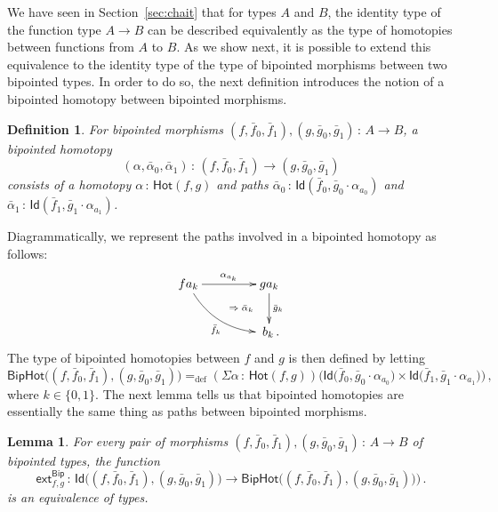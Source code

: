 \documentclass[10pt,a4paper,oneside,reqno]{amsart}
\numberwithin{equation}{section}
\theoremstyle{mythm}
\newtheorem{lemma}[theorem]{Lemma}
\theoremstyle{mydef}
\newtheorem{definition}[theorem]{Definition}
\theoremstyle{myrmk}
\newcommand{\defeq}{=_{\mathrm{def}}}
\newcommand{\co}{\,{:}\,}
\newcommand{\ct}{\cdot}
\newcommand{\Hot}{\mathsf{Hot}}
\newcommand{\ext}{\mathsf{ext}}
\newcommand{\Id}{\mathsf{Id}}
\newcommand{\Bip}{\mathsf{Bip}}
\newcommand{\BipHot}{\mathsf{BipHot}}
\begin{document}
We have seen in Section~\ref{sec:chait} that for types $A$ and $B$, the identity type of the function type
$A \to B$ can be described equivalently as the type of homotopies between functions from $A$ to $B$. As
we show next, it is possible to extend this equivalence to the identity type of the type of bipointed morphisms
between two bipointed types. In order to do so, the next definition  introduces the notion of a bipointed homotopy between bipointed morphisms. 





\begin{definition} \label{thm:biphomotopy} For bipointed morphisms $(f, \bar{f}_0, \bar{f}_1) , (g, \bar{g}_0, \bar{g}_1) \co A \to B$, 
a \emph{bipointed homotopy} 
\[
(\alpha, \bar{\alpha}_0, \bar{\alpha}_1) \co (f, \bar{f}_0, \bar{f}_1) \to  (g, \bar{g}_0, \bar{g}_1)
\] 
consists of a homotopy $\alpha \co  \Hot(f, g)$ and paths
$\bar{\alpha}_0 \co \Id(  \bar{f}_0 ,  \bar{g}_0 \ct \alpha_{a_0}  )$ and $\bar{\alpha}_1 \co \Id(
\bar{f}_1 , \bar{g}_1 \ct  \alpha_{a_1})$. 
\end{definition}

Diagrammatically, we represent the paths  involved in a bipointed homotopy as follows:
\[
\xymatrix@C=1.5cm{
f a_k  \ar[r]^{\alpha_{a_k}}  \ar@/_1pc/[dr]_{\bar{f}_k}  
\ar@{}[dr]|{\qquad \Rightarrow \; \bar{\alpha}_k}  & g a_k \ar[d]^{\bar{g}_k}  \\ 
 & \; b_k  \, .}
  \] 
The type of bipointed homotopies between $f$ and $g$ is then defined by letting
\[
 \BipHot  \big( (f,\bar{f}_0, \bar{f}_1), (g, \bar{g}_0, \bar{g}_1) \big)   \defeq   
 (\Sigma \alpha \co \Hot( f , g)) \big( 
  \Id\big( \bar{f}_0 ,   \bar{g}_0 \ct \alpha_{a_0}   \big) \times 
  \Id \big( \bar{f}_1,    \bar{g}_1 \ct \alpha_{a_1}  \big) \big) \, ,
\]
where $k \in \{ 0, 1\}$. The next lemma tells us that bipointed homotopies are essentially the
same thing as paths between bipointed morphisms.


\begin{lemma} \label{BoolHomSpace} 
For every  pair of morphisms $(f, \bar{f}_0, \bar{f}_1), (g, \bar{g}_0, \bar{g}_1) \co A \to B$ of bipointed types, the
function 
\[
\ext^{\Bip}_{f,g} \co \Id \big( (f, \bar{f}_0, \bar{f}_1), (g, \bar{g}_0, \bar{g}_1) \big) \to 
\BipHot\big( (f, \bar{f}_0, \bar{f}_1), (g, \bar{g}_0, \bar{g}_1) ) \big) \, .
\]
is an equivalence of types.
\end{lemma}
\end{document}
